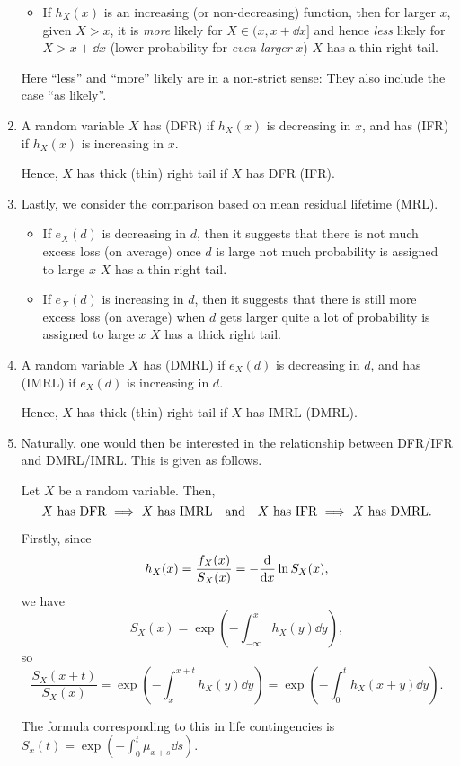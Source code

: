 \begin{enumerate}
\begin{itemize}
\item If \(h_X(x)\) is an increasing (or non-decreasing) function, then for
larger \(x\), given \(X>x\), it is \emph{more} likely for \(X\in(x,x+\dd{x}]\)
and hence \emph{less} likely for \(X>x+\dd{x}\) (lower probability for
\emph{even larger} \(x\))  \(X\) has a thin right tail.
\end{itemize}
\begin{note}
Here ``less'' and ``more'' likely are in a non-strict sense: They also include
the case ``as likely''.
\end{note}
\item A random variable \(X\) has  (DFR) if
\(h_X(x)\) is decreasing in \(x\), and has  (IFR)
if \(h_X(x)\) is increasing in \(x\).

Hence, \(X\) has thick (thin) right tail if \(X\) has DFR (IFR).

\item Lastly, we consider the comparison based on mean residual lifetime (MRL).
\begin{itemize}
\item If \(e_X(d)\) is decreasing in \(d\), then it suggests that there is not
much excess loss (on average) once \(d\) is large  not much
probability is assigned to large \(x\)  \(X\) has a thin
right tail.

\item If \(e_X(d)\) is increasing in \(d\), then it suggests that there is
still more excess loss (on average) when \(d\) gets larger 
quite a lot of probability is assigned to large \(x\) 
\(X\) has a thick right tail.
\end{itemize}

\item A random variable \(X\) has  (DMRL) if
\(e_X(d)\) is decreasing in \(d\), and has  (IMRL) if \(e_X(d)\) is increasing in \(d\).

Hence, \(X\) has thick (thin) right tail if \(X\) has IMRL (DMRL).

\item Naturally, one would then be interested in the relationship between
DFR/IFR and DMRL/IMRL. This is given as follows.
\begin{proposition}
\label{prp:fr-imp-inv-mrl}
Let \(X\) be a random variable. Then,
\[
\text{\(X\) has DFR \(\implies\) \(X\) has IMRL}
\qqtext{and}
\text{\(X\) has IFR \(\implies\) \(X\) has DMRL}.
\]
\end{proposition}
\begin{pf}
Firstly, since
\[
h_X(x)=\frac{f_X(x)}{S_X(x)}=-\dv{}{x}\ln S_X(x),
\]
we have
\[
S_X(x)=\exp(-\int_{-\infty}^{x}h_X(y)\dd{y}),
\]
so
\[
\frac{S_X(x+t)}{S_X(x)}=\exp(-\int_{x}^{x+t}h_X(y)\dd{y})
=\exp(-\int_{0}^{t}h_X(x+y)\dd{y}).
\]
\begin{note}
The formula corresponding to this in life contingencies is
\(S_x(t)=\exp(-\int_{0}^{t}\mu_{x+s}\dd{s})\).
\end{note}


\end{pf}
\end{enumerate}

